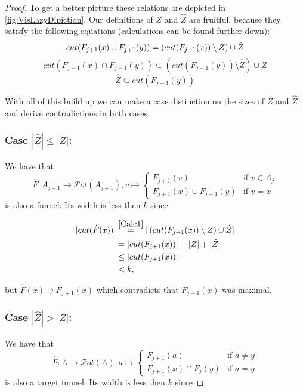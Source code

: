 \begin{proof}
    To get a better picture these relations are depicted in \cref{fig:VisLazyDipiction}. Our definitions of $Z$ and $\hat{Z}$ are fruitful, because they satisfy the following equations (calculations can be found further down):
    \begin{equation}
        cut(F_{j+1}(x) \cup F_{j+1}(y))=(cut(F_{j+1}(x))\setminus Z) \cup \hat{Z}\\
        \label{Calc1}
    \end{equation}
    \begin{equation}
        cut(F_{j+1}(x) \cap F_{j+1}(y))\subseteq (cut(F_{j+1}(y))\setminus \hat{Z}) \cup Z
        \label{Calc2}
    \end{equation}
    \begin{equation}
        \hat{Z} \subseteq cut(F_{j+1}(y))
        \label{Calc3}
    \end{equation}
    
    

    With all of this build up we can make a case distinction on the sizes of $Z$ and $\hat{Z}$ and derive contradictions in both cases.\\
    \subsubsection{Case $|\hat{Z}| \leq |Z|$:}
    We have that $$\hat{F}: A_{j+1} \rightarrow \mathcal{P}ot(A_{j+1}), v \mapsto \begin{cases}
        F_{j+1}(v) & \text{if } v \in A_j\\
        F_{j+1}(x) \cup F_{j+1}(y) & \text{if } v=x
    \end{cases}$$
    is also a funnel. Its width is less then $k$ since 
    
    \begin{align*}
        |cut(\hat{F}(x))| &\overset{\cref*{Calc1}}{=} |\left(cut(F_{j+1}(x))\setminus Z \right) \cup \hat{Z}|\\
        &= |cut(F_{j+1}(x))| - |Z| + |\hat{Z}|\\
        &\leq |cut(F_{j+1}(x))|\\
        &< k,
    \end{align*}
    
    but $\hat{F}(x)\supsetneq F_{j+1}(x)$ which contradicts that $F_{j+1}(x)$ was maximal.\\

    \subsubsection{Case $|\hat{Z}| > |Z|$:}
    We have that $$\hat{F}: A \rightarrow \mathcal{P}ot(A), a \mapsto \begin{cases}
        F_{j+1}(a) & \text{if } a \neq y\\
        F_{j+1}(x) \cap F_{j}(y) & \text{if } a=y
    \end{cases}$$
    is also a target funnel. Its width is less then $k$ since 


\end{proof}
